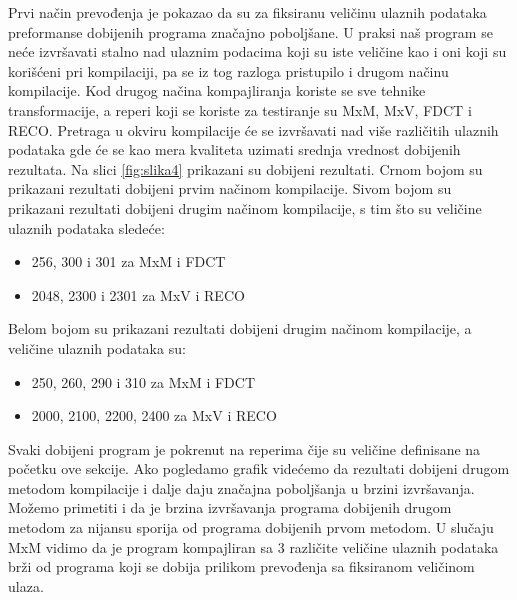 \documentclass[a4paper]{article}
\begin{document}
Prvi način prevođenja je pokazao da su za fiksiranu veličinu ulaznih podataka preformanse dobijenih programa značajno poboljšane.
U praksi naš program se neće izvršavati stalno nad ulaznim podacima koji su iste veličine kao i oni koji su korišćeni 
pri kompilaciji, pa se iz tog razloga pristupilo i drugom načinu kompilacije. Kod drugog načina kompajliranja 
koriste se sve tehnike transformacije, a reperi koji se koriste za testiranje su MxM, MxV, FDCT i RECO.
Pretraga u okviru kompilacije će se izvršavati nad više različitih ulaznih podataka gde će se kao mera kvaliteta uzimati
srednja vrednost dobijenih rezultata. Na slici \ref{fig:slika4} prikazani su dobijeni rezultati.
Crnom bojom su prikazani rezultati dobijeni prvim načinom kompilacije. Sivom bojom su prikazani rezultati dobijeni
drugim načinom kompilacije, s tim što su veličine ulaznih podataka sledeće:
\begin{itemize}
\item 256, 300 i 301 za MxM i FDCT
\item 2048, 2300 i 2301 za MxV i RECO
\end{itemize}
Belom bojom su prikazani rezultati dobijeni drugim načinom kompilacije, a veličine ulaznih podataka su:
\begin{itemize}
\item 250, 260, 290 i 310 za MxM i FDCT
\item 2000, 2100, 2200, 2400 za MxV i RECO
\end{itemize}
Svaki dobijeni program je pokrenut na reperima čije su veličine definisane na početku ove sekcije.
Ako pogledamo grafik videćemo da rezultati dobijeni drugom metodom kompilacije i dalje daju značajna poboljšanja 
u brzini izvršavanja. Možemo primetiti i da je brzina izvršavanja programa dobijenih drugom metodom za nijansu 
sporija od programa dobijenih prvom metodom. U slučaju MxM vidimo da je program kompajliran sa 3 različite veličine 
ulaznih podataka brži od programa koji se dobija prilikom prevođenja sa fiksiranom veličinom ulaza.
\end{document}
